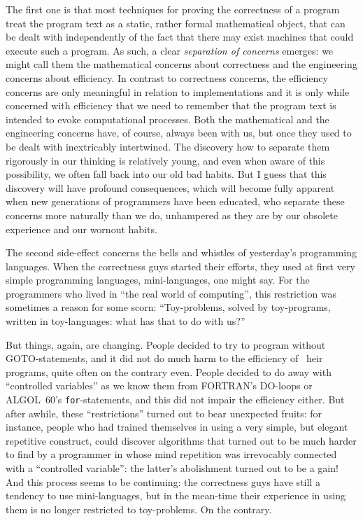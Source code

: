\documentclass[10pt,letterpaper,twocolumn]{article}
\newcommand{\acro}[1]{{\small\MakeUppercase{#1}\spacefactor1000}}
\begin{document}
The first one is that most techniques for 
proving the correctness of a program treat the 
program text as a static, rather formal mathematical object, that can be dealt
with independently of the fact that there may exist machines that could execute
such a program. As such, a clear 
\emph{separation of concerns} emerges: we might call them 
the mathematical concerns about correctness and 
the engineering concerns about efficiency. In 
contrast to correctness concerns, the efficiency 
concerns are only meaningful in relation to implementations and it is only while concerned with 
efficiency that we need to remember that the program text is intended to evoke
computational processes. Both the mathematical and the engineering concerns
have, of course, always been with us, but 
once they used to be dealt with inextricably intertwined. The discovery how to
separate them rigorously in our thinking is relatively young, and even when
aware of this possibility, we often fall back 
into our old bad habits. But I guess that this 
discovery will have profound consequences, which 
will become fully apparent when new generations of 
programmers have been educated, who separate these 
concerns more naturally than we do, unhampered as 
they are by our obsolete experience and our wornout habits. 

The second side-effect concerns the bells and 
whistles of yesterday's programming languages. When 
the correctness guys started their efforts, they 
used at first very simple programming languages, 
mini-languages, one might say. For the programmers 
who lived in ``the real world of computing'', this 
restriction was sometimes a reason for some scorn: 
``Toy-problems, solved by toy-programs, written in 
toy-languages: what has that to do with us?''

But things, again, are changing. People decided to try to program without
\acro{GOTO}-statements, and it did not do much harm to the efficiency of ~heir
programs, quite often on the contrary even. People decided to do away with
``controlled variables'' as we know them from \acro{FORTRAN}'s \acro{DO}-loops or \acro{ALGOL}~60's
\texttt{for}-statements, and this did not impair the efficiency either. But after
awhile, these ``restrictions'' turned out to bear unexpected fruits: for
instance, people who had trained themselves in using a very simple, but elegant
repetitive construct, could discover algorithms that turned out to be much
harder to find by a programmer in whose mind repetition was irrevocably
connected with a ``controlled variable'': the latter's abolishment turned out to
be a gain! And this process seems to be continuing: the correctness guys have
still a tendency to use mini-languages, but in the mean-time their experience in
using them is no longer restricted to toy-problems. On the contrary. 
\end{document}
